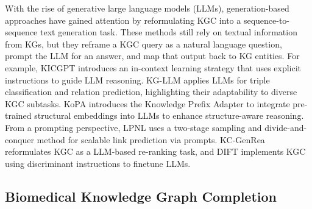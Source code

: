 \documentclass[11pt]{article}
\begin{document}
With the rise of generative large language models (LLMs), generation-based approaches have gained attention by reformulating KGC into a sequence-to-sequence text generation task. These methods still rely on textual information from KGs, but they reframe a KGC query as a natural language question, prompt the LLM for an answer, and map that output back to KG entities. For example, KICGPT \citep{wei2024kicgpt} introduces an in-context learning strategy that uses explicit instructions to guide LLM reasoning.  KG-LLM \citep{yao2025exploring} applies LLMs for triple classification and relation prediction, highlighting their adaptability to diverse KGC subtasks. KoPA \citep{zhang2024making} introduces the Knowledge Prefix Adapter to integrate pre-trained structural embeddings into LLMs to enhance structure-aware reasoning. From a prompting perspective, LPNL \citep{bi2024lpnl} uses a two-stage sampling and divide-and-conquer method for scalable link prediction via prompts. KC-GenRea \citep{wang2024kc} reformulates KGC as a LLM-based re-ranking task, and DIFT \citep{liu2024finetuninggenerativelargelanguage} implements KGC using discriminant instructions to finetune LLMs.

\subsection{Biomedical Knowledge Graph Completion}

\end{document}
